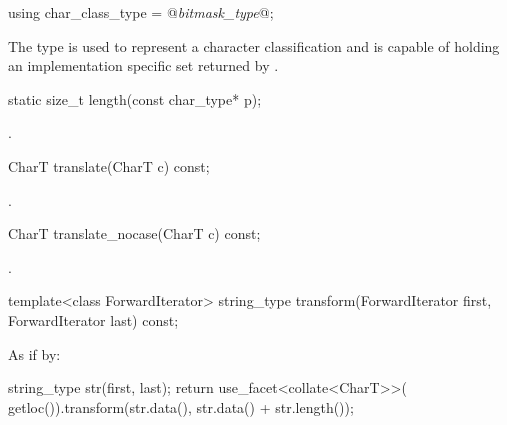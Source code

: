%
\begin{itemdecl}
using char_class_type = @\textit{bitmask_type}@;
\end{itemdecl}

\begin{itemdescr}
\pnum
The type  is used to represent a character
classification and is capable of holding an implementation specific
set returned by .
\end{itemdescr}

%
\begin{itemdecl}
static size_t length(const char_type* p);
\end{itemdecl}

\begin{itemdescr}
\pnum
\returns
{}.
\end{itemdescr}

%
\begin{itemdecl}
CharT translate(CharT c) const;
\end{itemdecl}

\begin{itemdescr}
\pnum
\returns
{}.
\end{itemdescr}

%
\begin{itemdecl}
CharT translate_nocase(CharT c) const;
\end{itemdecl}

\begin{itemdescr}
\pnum
\returns
{}.
\end{itemdescr}

%
\begin{itemdecl}
template<class ForwardIterator>
  string_type transform(ForwardIterator first, ForwardIterator last) const;
\end{itemdecl}

\begin{itemdescr}
\pnum
\effects
As if by:
\begin{codeblock}
string_type str(first, last);
return use_facet<collate<CharT>>(
  getloc()).transform(str.data(), str.data() + str.length());
\end{codeblock}
\end{itemdescr}

